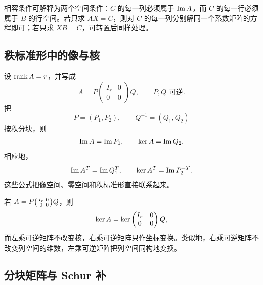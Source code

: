 \begin{remark}
相容条件可解释为两个空间条件：$C$ 的每一列必须属于 $\operatorname{Im} A$，而 $C$ 的每一行必须属于 $B$ 的行空间。若只求 $AX=C$，则对 $C$ 的每一列分别解同一个系数矩阵的方程即可；若只求 $XB=C$，可转置后同样处理。
\end{remark}

\subsection{秩标准形中的像与核}

设 $\operatorname{rank} A=r$，并写成
\begin{equation}
 A=P
 \begin{pmatrix}I_r&0\\0&0\end{pmatrix}
 Q,
 \qquad P,Q\text{ 可逆}.
\end{equation}
把
\begin{equation}
 P=(P_1,P_2),
 \qquad
 Q^{-1}=(Q_1,Q_2)
\end{equation}
按秩分块，则
\begin{equation}
 \operatorname{Im} A=\operatorname{Im} P_1,
 \qquad
 \operatorname{ker} A=\operatorname{Im} Q_2.
\end{equation}
相应地，
\begin{equation}
 \operatorname{Im} A^T=\operatorname{Im} Q^T_1,
 \qquad
 \operatorname{ker} A^T=\operatorname{Im} P^{-T}_2.
\end{equation}
这些公式把像空间、零空间和秩标准形直接联系起来。

\begin{proposition}
若 $A=P\begin{psmallmatrix}I_r&0\\0&0\end{psmallmatrix}Q$，则
\begin{equation}
 \operatorname{ker} A=\operatorname{ker}\begin{pmatrix}I_r&0\\0&0\end{pmatrix}Q,
\end{equation}
而左乘可逆矩阵不改变核，右乘可逆矩阵只作坐标变换。类似地，右乘可逆矩阵不改变列空间的维数，左乘可逆矩阵把列空间同构地变换。
\end{proposition}

\subsection{分块矩阵与 Schur 补}

